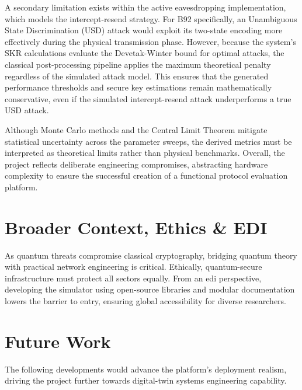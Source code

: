 \documentclass[11pt, a4paper]{report}
\begin{document}
A secondary limitation exists within the active eavesdropping implementation, which models the intercept-resend strategy. For B92 specifically, an Unambiguous State Discrimination (USD) attack would exploit its two-state encoding more effectively during the physical transmission phase. However, because the system's SKR calculations evaluate the Devetak-Winter bound for optimal attacks, the classical post-processing pipeline applies the maximum theoretical penalty regardless of the simulated attack model. This ensures that the generated performance thresholds and secure key estimations remain mathematically conservative, even if the simulated intercept-resend attack underperforms a true USD attack.

Although Monte Carlo methods and the Central Limit Theorem mitigate statistical uncertainty across the parameter sweeps, the derived metrics must be interpreted as theoretical limits rather than physical benchmarks. Overall, the project reflects deliberate engineering compromises, abstracting hardware complexity to ensure the successful creation of a functional protocol evaluation platform.

\section{Broader Context, Ethics \& EDI}
\label{sec:context}

As quantum threats compromise classical cryptography, bridging quantum theory with practical network engineering is critical. Ethically, quantum-secure infrastructure must protect all sectors equally. From an \gls{edi} perspective, developing the simulator using open-source libraries and modular documentation lowers the barrier to entry, ensuring global accessibility for diverse researchers.

\section{Future Work}
\label{sec:future}

The following developments would advance the platform's deployment 
realism, driving the project further towards digital-twin systems engineering capability.
\end{document}
